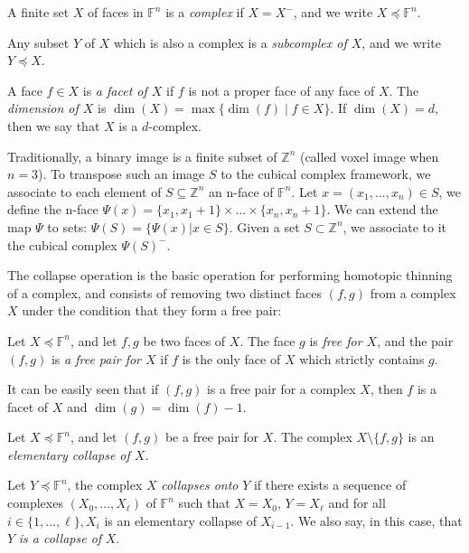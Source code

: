 \documentclass[final,envcountsame]{llncs}
\def\myem#1{{\em #1}}
\def\V2C{\Psi}
\def\Zset{\Z}
\def\Z{\mathbb{Z}}
\def\allfaces#1{\mathbb{F}^{#1}}
\def\subcomplex#1#2{#1 \preceq #2}
\def\complex#1#2{\subcomplex{#2}{\allfaces{#1}}}
\def\closure#1{#1^-}
\def\mydim#1{\dim(#1)}
\def\suchthat{\;|\;}
\def\dinterval#1#2{\{#1,\ldots,#2\}}
\begin{document}
\begin{definition}
A finite set $X$ of faces in $\allfaces{n}$ is a \myem{complex} if $X=\closure{X}$, and we write $\complex{n}{X}$. 

Any subset $Y$ of $X$ which is also a complex is a \myem{subcomplex of $X$}, and we write $\subcomplex{Y}{X}$.
\end{definition}



A face $f \in X$ is \myem{a facet of $X$} if $f$ is not a proper face of any face of $X$. The \myem{dimension of $X$} is $\mydim{X} = \max\{\mydim{f} \suchthat f \in X\}$. If $\mydim{X} = d$, then we say that $X$ is a $d$-complex.

Traditionally, a binary image is a finite subset of $\Zset^n$ (called voxel image when $n=3$). To transpose such an image $S$ to the cubical complex framework, we associate to each element of $S\subseteq \Zset^n$ an n-face of $\allfaces{n}$. Let $x=(x_1,...,x_n) \in S$, we define the n-face $\V2C(x) = \{x_1, x_1 + 1\} \times \ldots \times \{x_n, x_n + 1\}$. We can extend the map $\V2C$ to sets: $\V2C(S)=\{\V2C(x) | x \in S\}$. Given a set $S \subset \Zset^n$, we associate to it the cubical complex $\closure{\V2C(S)}$.

The collapse operation is the basic operation for performing homotopic thinning of a complex, and consists of removing two distinct faces $(f,g)$ from a complex $X$ under the condition that they form a free pair:

\begin{definition}
Let $\complex{n}{X}$, and let $f,g$ be two faces of $X$. The face $g$ is \myem{free for $X$}, and the pair $(f,g)$ is \myem{a free pair for $X$} if $f$ is the only face of $X$ which strictly contains $g$. 
\end{definition}

It can be easily seen that if $(f,g)$ is a free pair for a complex $X$, then $f$ is a facet of $X$ and $\dim(g) = \dim(f)-1$.

\begin{definition}
Let $\complex{n}{X}$, and let $(f,g)$ be a free pair for $X$. The complex $X \setminus \{f,g\}$ is an \myem{elementary collapse of $X$}.

Let $\complex{n}{Y}$, the complex $X$ \myem{collapses onto} $Y$ if there exists a sequence of complexes $(X_0,...,X_\ell)$ of $\allfaces{n}$ such that $X=X_0$, $Y=X_\ell$ and for all $i \in \dinterval{1}{\ell}, X_{i}$ is an elementary collapse of $X_{i-1}$. We also say, in this case, that $Y$ \myem{is a collapse of} $X$.
\end{definition}
\end{document}
